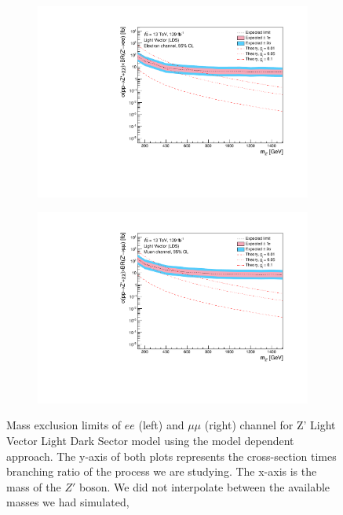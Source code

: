\documentclass[12pt, a4paper]{book}
\begin{document}
\begin{figure}[!ht]
	\centering
   \begin{subfigure}[b]{0.49\textwidth}
      \centering
      \includegraphics[width=1\textwidth]{Limits/LV_LDS/mass_exclusion_ee.pdf}
      \end{subfigure}
   \hfill
   \begin{subfigure}[b]{0.49\textwidth}
      \centering
      \includegraphics[width=1\textwidth]{Limits/LV_LDS/mass_exclusion_uu.pdf}
      \end{subfigure}
   \caption[Expected mass exclusion limits of $ee$ and $\mu\mu$ channel for all Z' LV LDS model using the model dependent approach]{Mass exclusion limits of $ee$ (left) and $\mu\mu$ (right) channel for Z' Light Vector Light Dark Sector model using the model dependent approach. The y-axis of both plots represents the cross-section times branching ratio of the process we are studying. The x-axis is the mass of the $Z'$ boson. We did not interpolate between the available masses we had simulated, 
}
\end{figure}
\end{document}
